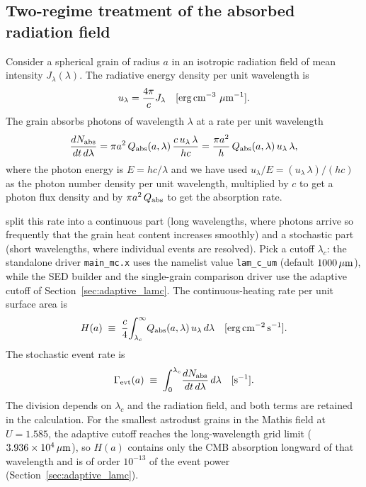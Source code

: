 \documentclass{my_memo}
\newcommand{\Qabs}{Q_{\rm abs}}
\newcommand{\umc}{\,\mu{\rm m}}
\newcommand{\ulam}{u_\lambda}
\newcommand{\Jlam}{J_\lambda}
\begin{document}
\subsection{Two-regime treatment of the absorbed radiation field}

Consider a spherical grain of radius $a$ in an isotropic radiation
field of mean intensity $\Jlam(\lambda)$.  The radiative energy
density per unit wavelength is
\begin{equation}
\ulam = \frac{4\pi}{c}\Jlam \quad
[\text{erg}\,\text{cm}^{-3}\,\umc^{-1}].
\end{equation}
The grain absorbs photons of wavelength $\lambda$ at a rate per unit
wavelength
\begin{equation}\label{eq:dRate}
\frac{dN_{\rm abs}}{dt\,d\lambda}
   = \pi a^2 \, \Qabs(a,\lambda)\,\frac{c\,\ulam\,\lambda}{hc}
   = \frac{\pi a^2}{h}\,\Qabs(a,\lambda)\,\ulam\,\lambda,
\end{equation}
where the photon energy is $E = hc/\lambda$ and we have used
$\ulam/E = (\ulam\,\lambda)/(hc)$ as the photon number density per
unit wavelength, multiplied by $c$ to get a photon flux density and
by $\pi a^2\,\Qabs$ to get the absorption rate.

\citet{DraineAnderson1985} split this rate into a continuous part
(long wavelengths, where photons arrive so frequently that the grain
heat content increases smoothly) and a stochastic part (short
wavelengths, where individual events are resolved).  Pick a cutoff
$\lambda_c$: the standalone driver \verb|main_mc.x| uses the namelist
value \verb|lam_c_um| (default $1000\umc$), while the SED builder and
the single-grain comparison driver use the adaptive cutoff of
Section~\ref{sec:adaptive_lamc}.  The continuous-heating rate per
unit surface area is
\begin{equation}\label{eq:Hcont}
H(a) \;\equiv\; \frac{c}{4}\!\int_{\lambda_c}^{\infty}\!
       \Qabs(a,\lambda)\,\ulam\,d\lambda
       \quad [{\rm erg}\,{\rm cm}^{-2}\,{\rm s}^{-1}].
\end{equation}
The stochastic event rate is
\begin{equation}\label{eq:rateEvt}
\Gamma_{\rm evt}(a) \;\equiv\;
       \int_{0}^{\lambda_c}\!
       \frac{dN_{\rm abs}}{dt\,d\lambda}\,d\lambda
       \quad [{\rm s}^{-1}].
\end{equation}
The division depends on $\lambda_c$ and the radiation field, and both
terms are retained in the calculation. For the smallest astrodust
grains in the Mathis field at $U=1.585$, the adaptive cutoff reaches
the long-wavelength grid limit ($3.936\times10^4\umc$), so $H(a)$
contains only the CMB absorption longward of that wavelength and is
of order $10^{-13}$ of the event power (Section~\ref{sec:adaptive_lamc}).
\end{document}
